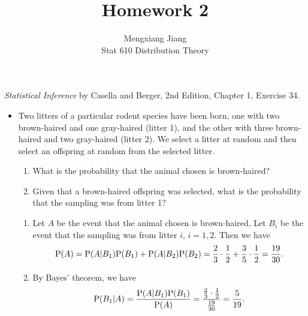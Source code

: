 \documentclass[12pt]{article}
\newcommand{\Prob}{{\rm P}}
\newenvironment{problem}[2][Problem]{\begin{trivlist}
\item[\hskip \labelsep {\bfseries #1}\hskip \labelsep {\bfseries #2.}]}
{\end{trivlist}}
\begin{document}
 
 
\title{Homework 2}%
\author{Mengxiang Jiang\\ %
Stat 610 Distribution Theory} %
 
\maketitle
 
\begin{problem}{1} %
  \textit{Statistical Inference} by Casella and Berger, 2nd Edition, Chapter 1, 
  Exercise 34.
  \begin{itemize}
    \item[34.] Two litters of a particular rodent species have been born,
    one with two brown-haired and one gray-haired (litter 1), and the other
    with three brown-haired and two gray-haired (litter 2). We select a
    litter at random and then select an offspring at random from the selected
    litter.
    \begin{enumerate}
      \item What is the probability that the animal chosen is brown-haired?
      \item Given that a brown-haired offspring was selected, what is the
      probability that the sampling was from litter 1?
    \end{enumerate}
    \begin{enumerate}
      \item Let $A$ be the event that the animal chosen is brown-haired,
      Let $B_i$ be the event that the sampling was from litter $i$, $i=1,2$.
      Then we have 
      \[
        \Prob(A) = \Prob(A|B_1)\Prob(B_1) + \Prob(A|B_2)\Prob(B_2) 
        = \frac{2}{3}\cdot\frac{1}{2} + \frac{3}{5}\cdot\frac{1}{2} 
        = \frac{19}{30}.
      \]
      \item By Bayes' theorem, we have
      \[
        \Prob(B_1|A) = \frac{\Prob(A|B_1)\Prob(B_1)}{\Prob(A)} 
        = \frac{\frac{2}{3}\cdot\frac{1}{2}}{\frac{19}{30}} 
        = \frac{5}{19}.
      \]
    \end{enumerate}
  \end{itemize}
\end{problem}
\end{document}
